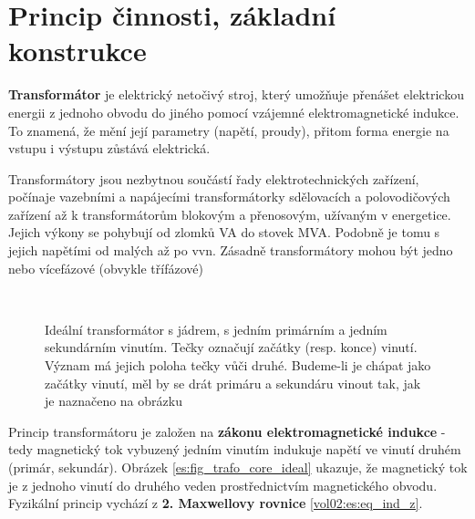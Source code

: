   \section{Princip činnosti, základní konstrukce}
    \begin{definition}
      \textbf{Transformátor} je elektrický netočivý stroj, který umožňuje pře\-nášet elektrickou 
      energii z jednoho obvodu do jiného pomocí vzá\-jemné elektromagnetické indukce. To znamená, 
      že mění její parametry (napětí, proudy), přitom forma energie na vstupu i výstupu zůstává 
      elektrická.
    \end{definition}

    Transformátory jsou nezbytnou součástí řady elektrotechnických zařízení, počínaje vazebními a 
    napájecími transformátorky sdělovacích a polovodičových zařízení až k transformátorům blokovým 
    a přenosovým, užívaným v energetice. Jejich výkony se pohybují od zlomků VA do stovek MVA. 
    Podobně je tomu s jejich napětími od malých až po vvn. Zásadně transformátory  mohou být jedno 
    nebo vícefázové (obvykle třífázové)

    \begin{figure}[ht!]
      \centering
        {}                \\
        {}
      \caption{Ideální transformátor s jádrem, s jedním primárním a jedním sekundárním 
              vinutím. Tečky označují začátky (resp. konce) vinutí. Význam má jejich poloha tečky 
              vůči druhé. Budeme-li je chápat jako začátky vinutí, měl by se drát primáru a 
              sekundáru vinout tak, jak je naznačeno na obrázku}
      \label{es:fig_trafo_ideal}
    \end{figure}
    Princip transformátoru je založen na \textbf{zákonu elektromagnetické indukce} - tedy 
    magnetický tok vybuzený jedním vinutím indukuje napětí ve vinutí druhém (primár, sekundár). 
    Obrázek \ref{es:fig_trafo_core_ideal} ukazuje, že magnetický tok je z jednoho vinutí do druhého 
    veden  prostřednictvím magnetického obvodu. Fyzikální princip vychází z \textbf{2. Maxwellovy
    rovnice} \ref{vol02:es:eq_ind_z}.

